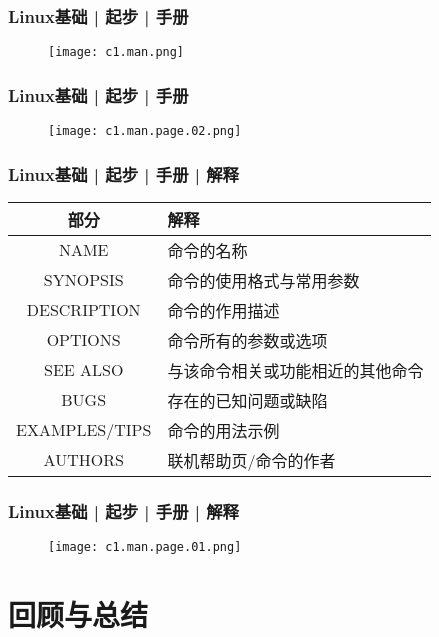 \begin{frame}
  \frametitle{Linux基础 | 起步 | 手册}
  \begin{figure}
    \centering
    \texttt{[image: c1.man.png]}
  \end{figure}
\end{frame}

\begin{frame}
  \frametitle{Linux基础 | 起步 | 手册}
  \begin{figure}
    \centering
    \texttt{[image: c1.man.page.02.png]}
  \end{figure}
\end{frame}

\begin{frame}
  \frametitle{Linux基础 | 起步 | 手册 | 解释}
  \begin{table}
    \centering
    \begin{tabular}{cl}
      \hline
      \rowcolor{blue!50}部分 & 解释\\
      \hline
      NAME & 命令的名称\\
      SYNOPSIS & 命令的使用格式与常用参数\\
      DESCRIPTION & 命令的作用描述\\
      OPTIONS & 命令所有的参数或选项\\
      SEE ALSO & 与该命令相关或功能相近的其他命令\\
      BUGS & 存在的已知问题或缺陷\\
      EXAMPLES/TIPS & 命令的用法示例\\
      AUTHORS & 联机帮助页/命令的作者\\
      \hline
    \end{tabular}
  \end{table}
\end{frame}

\begin{frame}
  \frametitle{Linux基础 | 起步 | 手册 | 解释}
  \begin{figure}
    \centering
    \texttt{[image: c1.man.page.01.png]}
  \end{figure}
\end{frame}

\section{回顾与总结}
